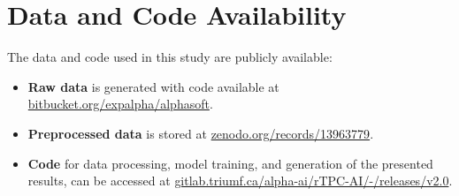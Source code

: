 \documentclass[a4paper,11pt]{article}
\begin{document}
\FloatBarrier

\section{Data and Code Availability}
The data and code used in this study are publicly available:
\begin{itemize}
    \item \textbf{Raw data} is generated with code available at \url{bitbucket.org/expalpha/alphasoft}.
    \item \textbf{Preprocessed data} is stored at \url{zenodo.org/records/13963779}.
    \item \textbf{Code} for data processing, model training, and generation of the presented results, can be accessed at \url{gitlab.triumf.ca/alpha-ai/rTPC-AI/-/releases/v2.0}.
\end{itemize}

\FloatBarrier



\newpage
\end{document}
